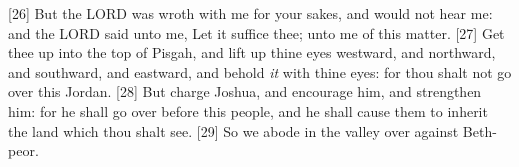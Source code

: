[26] \textcolor[cmyk]{0.99998,1,0,0}{But the LORD was wroth with me for your sakes, and would not hear me: and the LORD said unto me, Let it suffice thee;  unto me of this matter.}
[27] \textcolor[cmyk]{0.99998,1,0,0}{Get thee up into the top of Pisgah, and lift up thine eyes westward, and northward, and southward, and eastward, and behold \emph{it} with thine eyes: for thou shalt not go over this Jordan.}
[28] \textcolor[cmyk]{0.99998,1,0,0}{But charge Joshua, and encourage him, and strengthen him: for he shall go over before this people, and he shall cause them to inherit the land which thou shalt see.}
[29] \textcolor[cmyk]{0.99998,1,0,0}{So we abode in the valley over against Beth-peor.}